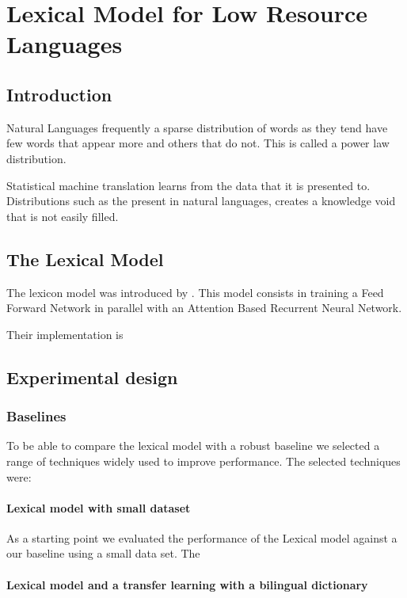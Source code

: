 \chapter{Lexical Model for Low Resource Languages} \label{ch:chapter3}
\section{Introduction}

Natural Languages frequently a sparse distribution of words as they tend have few words that appear more and others that do not. This is called a power law distribution. 

Statistical machine translation learns from the data that it is presented to. Distributions such as the present in natural languages, creates a knowledge void that is not easily filled.

\section{The Lexical Model}
The lexicon model was introduced by \citet{DBLP:journals/corr/abs-1710-01329}. This model consists in training a Feed Forward Network in parallel with an Attention Based Recurrent Neural Network.

Their implementation is

\section{Experimental design}\label{sec:experimentdesign}

\subsection{Baselines} \label{sec:baselines}

To be able to compare the lexical model with a robust baseline we selected a range of techniques widely used to improve performance. The selected techniques were:


\subsubsection{Lexical model with small dataset}

As a starting point we evaluated the performance of the Lexical model against a our baseline using a small data set. The 

\subsubsection{Lexical model and a transfer learning with a bilingual dictionary}

